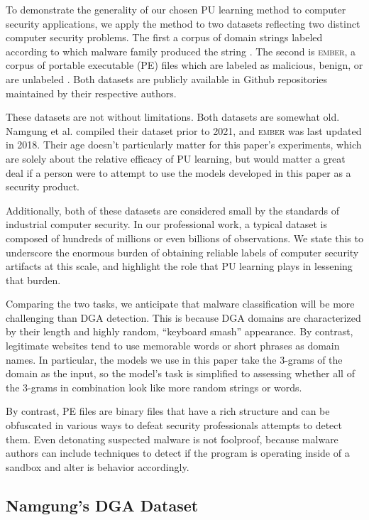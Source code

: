 \documentclass[conference]{IEEEtran}
\begin{document}
    To demonstrate the generality of our chosen PU learning method to computer security applications, we apply the method to two datasets reflecting two distinct computer security problems. The first a corpus of domain strings labeled according to which malware family produced the string \cite{namgung-2021}. The second is \textsc{ember}, a corpus of portable executable (PE) files which are labeled as malicious, benign, or are unlabeled \cite{anderson-2018}. Both datasets are publicly available in Github repositories maintained by their respective authors.

    These datasets are not without limitations. Both datasets are somewhat old. Namgung et al. compiled their dataset prior to 2021, and \textsc{ember} was last updated in 2018. Their age doesn't particularly matter for this paper's experiments, which are solely about the relative efficacy of PU learning, but would matter a great deal if a person were to attempt to use the models developed in this paper as a security product.

    Additionally, both of these datasets are considered small by the standards of industrial computer security. In our professional work, a typical dataset is composed of hundreds of millions or even billions of observations. We state this to underscore the enormous burden of obtaining reliable labels of computer security artifacts at this scale, and highlight the role that PU learning plays in lessening that burden.

    Comparing the two tasks, we anticipate that malware classification will be more challenging than DGA detection. This is because DGA domains are characterized by their length and highly random, ``keyboard smash'' appearance. By contrast, legitimate websites tend to use  memorable words or short phrases as domain names. In particular, the models we use in this paper take the 3-grams of the domain as the input, so the model's task is simplified to assessing whether all of the 3-grams in combination look like more random strings or words.

    By contrast, PE files are binary files that have a rich structure and can be obfuscated in various ways to defeat security professionals attempts to detect them. Even detonating suspected malware is not foolproof, because malware authors can include techniques to detect if the program is operating inside of a sandbox and alter is behavior accordingly.

\subsection{Namgung's DGA Dataset}
\end{document}

